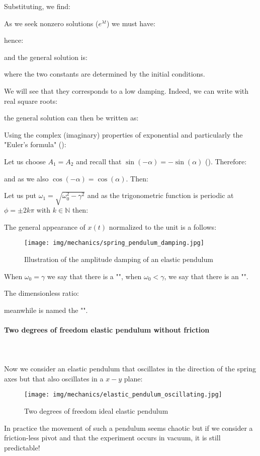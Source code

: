 	Substituting, we find:
	
	As we seek nonzero solutions ($e^{\lambda t}$) we must have:
	
	hence:
	
	and the general solution is:
	
	where the two constants are determined by the initial conditions.

	We will see that they corresponds to a low damping. Indeed, we can write with real square roots:
	
	the general solution can then be written as:
	
	Using the complex (imaginary) properties of exponential and particularly the "Euler's formula" ():
	
	Let us choose $A_1=A_2$ and recall that $\sin(-\alpha)=-\sin(\alpha)$ (). Therefore:
	
	and as we also $\cos(-\alpha)=\cos(\alpha)$. Then:
	
	Let us put $\omega_1=\sqrt{\omega_0^2-\gamma^2}$ and as the trigonometric function is periodic at $\phi=\pm 2k\pi$ with $k\in\mathbb{N}$ then:
	
	The general appearance of $x(t)$ normalized to the unit is a follows:
	\begin{figure}[H]
		\centering
		\texttt{[image: img/mechanics/spring\_pendulum\_damping.jpg]}
		\caption{Illustration of the amplitude damping of an elastic pendulum}
	\end{figure}
	When $\omega_0=\gamma$ we say that there is a "", when $\omega_0<\gamma$, we say that there is an "".

	The dimensionless ratio:
	
	meanwhile is named the "".
	
	\paragraph{Two degrees of freedom elastic pendulum without friction}\mbox{}\\\\
	Now we consider an elastic pendulum that oscillates in the direction of the spring axes but that also oscillates in a $x-y$ plane:
	\begin{figure}[H]
		\centering
		\texttt{[image: img/mechanics/elastic\_pendulum\_oscillating.jpg]}
		\caption{Two degrees of freedom ideal elastic pendulum}
	\end{figure}
	In practice the movement of such a pendulum seems chaotic but if we consider a friction-less pivot and that the experiment occurs in vacuum, it is still predictable!
	
